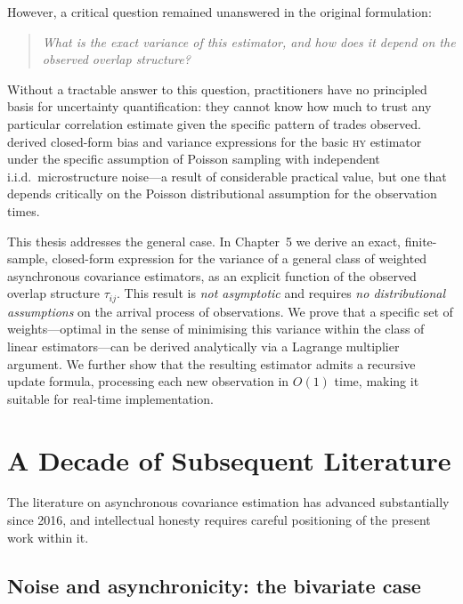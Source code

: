 \documentclass[reqno, 12pt]{amsart}
\newcommand{\tauij}{\tau_{ij}}
\newcommand{\HY}{\textsc{hy}}
\theoremstyle{plain}
\theoremstyle{definition}
\theoremstyle{remark}
\begin{document}
However, a critical question remained unanswered in the original
formulation:
\begin{quote}
\emph{What is the exact variance of this estimator, and how does it
depend on the observed overlap structure?}
\end{quote}
Without a tractable answer to this question, practitioners have no
principled basis for uncertainty quantification: they cannot know how
much to trust any particular correlation estimate given the specific
pattern of trades observed. \citet{griffin2011} derived closed-form
bias and variance expressions for the basic \HY{} estimator under the
specific assumption of Poisson sampling with independent i.i.d.\
microstructure noise---a result of considerable practical value, but
one that depends critically on the Poisson distributional assumption
for the observation times.

This thesis addresses the general case. In Chapter~5 we derive an
exact, finite-sample, closed-form expression for the variance of a
general class of weighted asynchronous covariance estimators, as an
explicit function of the observed overlap structure $\tauij$. This
result is \emph{not asymptotic} and requires \emph{no distributional
assumptions} on the arrival process of observations. We prove that a
specific set of weights---optimal in the sense of minimising this
variance within the class of linear estimators---can be derived
analytically via a Lagrange multiplier argument. We further show that
the resulting estimator admits a recursive update formula, processing
each new observation in $O(1)$ time, making it suitable for real-time
implementation.

\section{A Decade of Subsequent Literature}
\label{sec:literature_fin}

The literature on asynchronous covariance estimation has advanced
substantially since 2016, and intellectual honesty requires careful
positioning of the present work within it.

\subsection{Noise and asynchronicity: the bivariate case}
\end{document}
